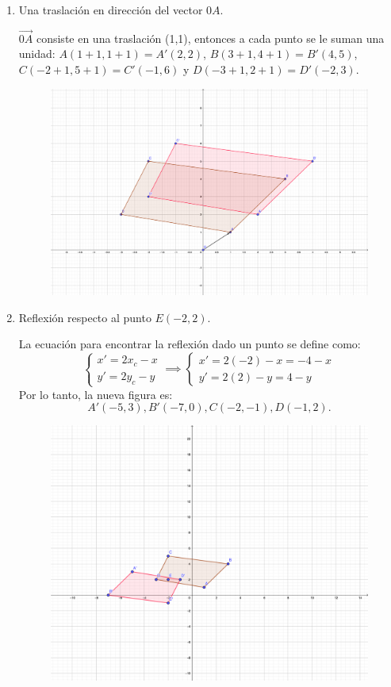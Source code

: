 \begin{problema}
\begin{enumerate}
	\begin{enumerate}
		\item Una traslación en dirección del vector $0A$. 
		\begin{sol}
			$\overrightarrow{0A}$ consiste en una traslación (1,1), entonces a cada punto se le suman una unidad: $A(1+1,1+1)=A'(2,2)$, $B(3+1,4+1)=B'(4,5)$, $C(-2+1,5+1)=C'(-1,6)$ y $D(-3+1,2+1)=D'(-2,3)$. 
			\begin{figure}[H]
				\centering
				\includegraphics[scale=1]{Images/P1-3}
			\end{figure}
		\end{sol}
		\item Reflexión respecto al punto $E(-2,2)$. 
		\begin{sol}
			La ecuación para encontrar la reflexión dado un punto se define como: 
			$$\begin{cases}
				x' =2x_c-x\\
				y' =2y_c-y
			\end{cases}\implies\begin{cases}
			x' =2(-2)-x=-4-x\\
			y' =2(2)-y=4-y
		\end{cases} $$
	Por lo tanto, la nueva figura es: 
	$$A'(-5,3), B'(-7,0), C(-2,-1), D(-1,2).$$
			\begin{figure}[H]
				\centering
				\includegraphics[scale=0.4]{Images/P1-c}

\end{figure}
\end{sol}
\end{enumerate}
\end{enumerate}
\end{problema}
